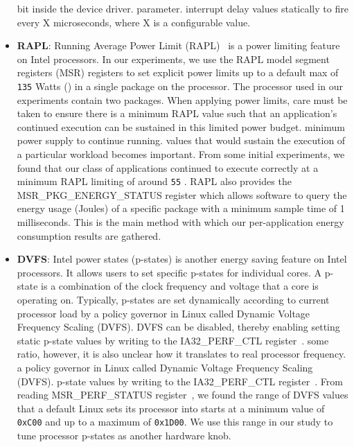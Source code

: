 \begin{itemize}
bit inside the device driver.
parameter.
interrupt delay values statically to fire every X microseconds, where X is a
configurable value.


\item \textbf{RAPL}: Running Average Power Limit (RAPL)~\cite{intel_rapl} is a
power limiting feature on Intel processors.
In our experiments, we use the RAPL model segment registers (MSR) registers to
set explicit power limits up to a default max of \texttt{135} Watts (\watt) in
a single package on the processor. The processor used in our experiments
contain two packages. When applying power limits, care must be taken to ensure
there is a minimum RAPL value such that an application's continued execution
can be sustained in this limited power budget.
minimum power supply to continue running.
values that would sustain the execution of a particular workload becomes
important.
From some initial experiments, we found that our class of applications
continued to execute correctly at a minimum RAPL limiting of around \texttt{55}
\watt. RAPL also provides the MSR\_PKG\_ENERGY\_STATUS register which allows
software to query the energy usage (Joules) of a specific package with a
minimum sample time of 1 milliseconds.
This is the main method with which our per-application energy consumption
results are gathered.

\item \textbf{DVFS}: Intel power states (p-states) is another energy saving
feature on Intel processors.
It allows users to set specific p-states for individual cores.
A p-state is a combination of the clock frequency and voltage that a core is
operating on. Typically,  p-states are set dynamically according to current
processor load by a policy governor in Linux called Dynamic Voltage Frequency
Scaling (DVFS). DVFS can be disabled, thereby enabling setting static p-state
values by writing to the IA32\_PERF\_CTL register~\cite{intel_msr}.
some ratio, however, it is also unclear how it translates to real processor
frequency.
a policy governor in Linux called Dynamic Voltage Frequency Scaling (DVFS).
p-state values by writing to the IA32\_PERF\_CTL register~\cite{intel_msr}.
From reading MSR\_PERF\_STATUS register~\cite{intel_msr}, we found the range of
DVFS values that a default Linux sets its processor into starts at a minimum
value of \texttt{0xC00} and up to a maximum of \texttt{0x1D00}. We use this
range in our study to tune processor p-states as another hardware knob.
\end{itemize}

